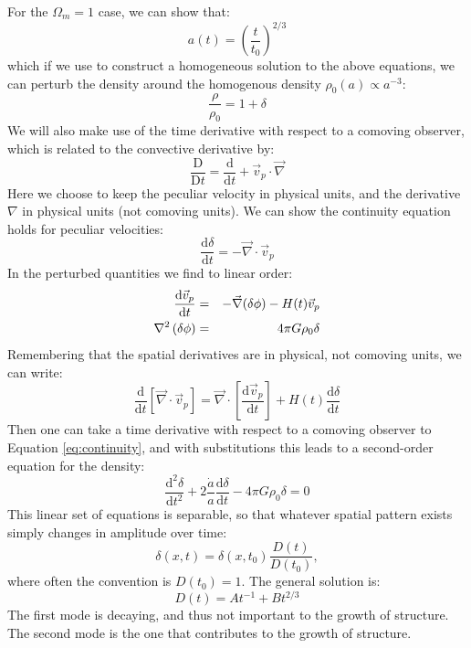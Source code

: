 For the $\Omega_m = 1$ case, we can show that:
\begin{equation}
a(t) = \left(\frac{t}{t_0}\right)^{2/3}
\end{equation} 
which if we use to construct a homogeneous solution to the above
equations, we can perturb the density around the homogenous density
$\rho_0(a) \propto a^{-3}$:
\begin{equation}
\frac{\rho}{\rho_0} = 1+ \delta
\end{equation}
We will also make use of the time derivative with respect to a
comoving observer, which is related to the convective derivative by:
\begin{equation}
\frac{\mathrm{D}}{\mathrm{D}t} = \frac{\mathrm{d}}{\mathrm{d} t} +
\vec{v}_p\cdot\vec{\nabla}
\end{equation}
Here we choose to keep the peculiar velocity in physical units, and
the derivative $\nabla$ in physical units (not comoving units).  We can
show the continuity equation holds for peculiar velocities:
\begin{equation}
\label{eq:continuity}
\frac{\mathrm{d}\delta}{\mathrm{d}t} =  
- \vec\nabla\cdot\vec{v}_p
\end{equation}
In the perturbed quantities we find to linear order:
\begin{eqnarray}
\frac{\mathrm{d}\vec{v}_p}{\mathrm{d}t} &=&
- \vec\nabla(\delta\phi)
- H(t) \vec{v}_p \cr
\nabla^2\left(\delta\phi\right)&=& 4\pi G \rho_0 \delta
\end{eqnarray}
Remembering that the spatial derivatives are in physical, not comoving
units, we can write:
\begin{equation}
\frac{\mathrm{d}}{\mathrm{d}t} \left[ \vec\nabla\cdot\vec{v}_p \right]
= 
\vec\nabla\cdot
\left[\frac{\mathrm{d}\vec{v}_p}{\mathrm{d}t} \right]
+ H(t) \frac{\mathrm{d}\delta}{\mathrm{d}t} 
\end{equation}
Then one can take a time derivative with respect to a comoving
observer to Equation \ref{eq:continuity}, and with substitutions this
leads to a second-order equation for the density:
\begin{equation}
\label{eq:secondorder}
\frac{\mathrm{d}^2\delta}{\mathrm{d}t^2} + 2 \frac{\dot a}{a} 
\frac{\mathrm{d}\delta}{\mathrm{d}t} - 4 \pi G \rho_0 \delta = 0 
\end{equation}
This linear set of equations is separable, so that whatever spatial
pattern exists simply changes in amplitude over time:
\begin{equation}
\delta(x, t) = \delta(x, t_0) \frac{D(t)}{D(t_0)},
\end{equation}
where often the convention is $D(t_0) = 1$.
  The general solution is:
\begin{equation}
\label{eq:lineargrowth}
D(t) = A t^{-1} + B t^{2/3}
\end{equation}
The first mode is decaying, and thus not important to the growth
of structure.  The second mode is the one that contributes to the
growth of structure.

